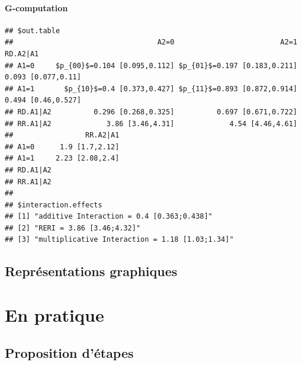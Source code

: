 \documentclass[
]{book}
\begin{document}
\hypertarget{g-computation}{%
\subsection*{G-computation}\label{g-computation}}

\begin{verbatim}
## $out.table
##                                  A2=0                         A2=1           RD.A2|A1
## A1=0     $p_{00}$=0.104 [0.095,0.112] $p_{01}$=0.197 [0.183,0.211] 0.093 [0.077,0.11]
## A1=1       $p_{10}$=0.4 [0.373,0.427] $p_{11}$=0.893 [0.872,0.914] 0.494 [0.46,0.527]
## RD.A1|A2          0.296 [0.268,0.325]          0.697 [0.671,0.722]                   
## RR.A1|A2             3.86 [3.46,4.31]             4.54 [4.46,4.61]                   
##                 RR.A2|A1
## A1=0      1.9 [1.7,2.12]
## A1=1     2.23 [2.08,2.4]
## RD.A1|A2                
## RR.A1|A2                
## 
## $interaction.effects
## [1] "additive Interaction = 0.4 [0.363;0.438]"     
## [2] "RERI = 3.86 [3.46;4.32]"                      
## [3] "multiplicative Interaction = 1.18 [1.03;1.34]"
\end{verbatim}

\hypertarget{repruxe9sentations-graphiques}{%
\chapter{Représentations graphiques}\label{repruxe9sentations-graphiques}}

\hypertarget{part-en-pratique}{%
\part{En pratique}\label{part-en-pratique}}

\hypertarget{proposition-duxe9tapes}{%
\chapter{Proposition d'étapes}\label{proposition-duxe9tapes}}
\end{document}
